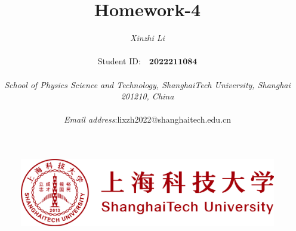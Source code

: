 \documentclass[a4paper,9pt]{article}
\begin{document}
\pagestyle{fancy}
\title{\textbf{\Huge{Homework-4}}}

\author{\textit{Xinzhi Li} \\\quad\\Student ID:~~$\boldsymbol{2022211084}$\\\quad\\ \textit{School of Physics Science and Technology, ShanghaiTech University, Shanghai 201210, China}\\\quad \\ \textit{Email address}:\quad lixzh2022@shanghaitech.edu.cn}


\begin{figure}[t]
\centering
\includegraphics[width=1\columnwidth]{logo/row.png}
\end{figure}

\maketitle\thispagestyle{empty}
\newpage
\setcounter{page}{1}
\end{document}
